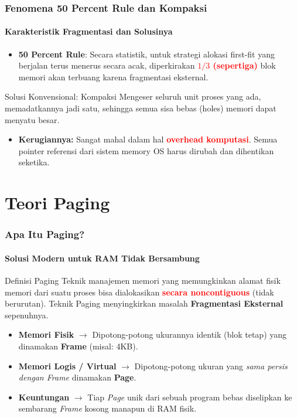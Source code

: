 \documentclass[t,aspectratio=169,xcolor=dvipsnames]{beamer}
\newcommand{\tem}[1]{\textbf{\textcolor{red}{#1}}}
\begin{document}
\begin{frame}
    \frametitle{Fenomena 50 Percent Rule dan Kompaksi}
    \framesubtitle{Karakteristik Fragmentasi dan Solusinya}
    \small
    \begin{itemize}
        \item \textbf{50 Percent Rule}: Secara statistik, untuk strategi alokasi first-fit yang berjalan terus menerus secara acak, diperkirakan \tem{$1/3$ (sepertiga)} blok memori akan terbuang karena fragmentasi eksternal.
    \end{itemize}
    
    \begin{alertblock}{Solusi Konvensional: Kompaksi}
        Mengeser seluruh unit proses yang ada, memadatkannya jadi satu, sehingga semua sisa bebas (holes) memori dapat menyatu besar.
        \begin{itemize}
            \item \textbf{Kerugiannya:} Sangat mahal dalam hal \tem{overhead komputasi}. Semua pointer referensi dari sistem memory OS harus dirubah dan dihentikan seketika.
        \end{itemize}
    \end{alertblock}
\end{frame}

\section{Teori Paging}

\begin{frame}
    \frametitle{Apa Itu Paging?}
    \framesubtitle{Solusi Modern untuk RAM Tidak Bersambung}
    \small
    \begin{block}{Definisi Paging}
        Teknik manajemen memori yang memungkinkan alamat fisik memori dari suatu proses bisa dialokasikan \tem{secara noncontiguous} (tidak berurutan). Teknik Paging menyingkirkan masalah \textbf{Fragmentasi Eksternal} sepenuhnya.
    \end{block}
    
    \begin{itemize}
        \item \textbf{Memori Fisik} $\rightarrow$ Dipotong-potong ukurannya identik (blok tetap) yang dinamakan \textbf{Frame} (misal: 4KB).
        \item \textbf{Memori Logis / Virtual} $\rightarrow$ Dipotong-potong ukuran yang \textit{sama persis dengan Frame} dinamakan \textbf{Page}.
        \item \textbf{Keuntungan} $\rightarrow$ Tiap \textit{Page} unik dari sebuah program bebas diselipkan ke sembarang \textit{Frame} kosong manapun di RAM fisik. 
    \end{itemize}
\end{frame}
\end{document}
